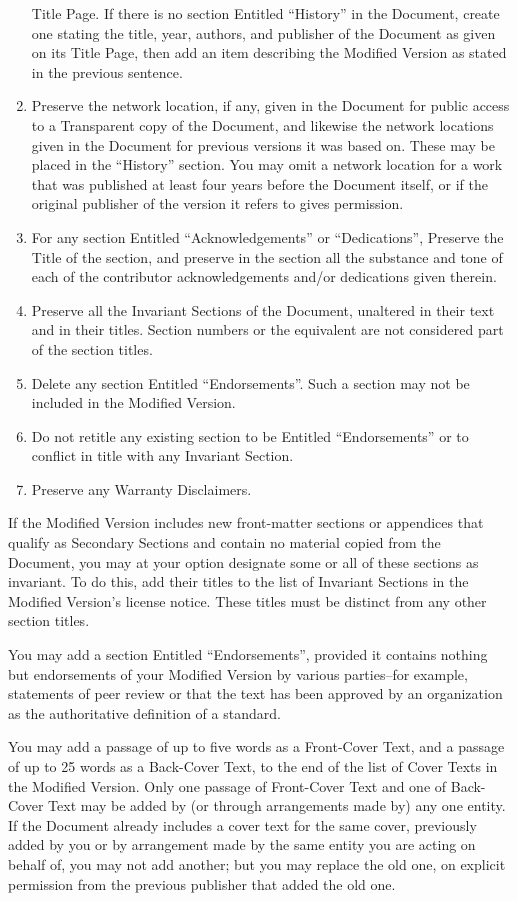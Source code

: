 \begin{enumerate}
       Title Page. If there is no section Entitled ``History'' in the Document, create one stating
       the title, year, authors, and publisher of the Document as given on its Title Page, then
       add an item describing the Modified Version as stated in the previous sentence.
 \item Preserve the network location, if any, given in the Document for public access to a
       Transparent copy of the Document, and likewise the network locations given in the Document
       for previous versions it was based on. These may be placed in the ``History'' section. You
       may omit a network location for a work that was published at least four years before the
       Document itself, or if the original publisher of the version it refers to gives permission.
 \item For any section Entitled ``Acknowledgements'' or ``Dedications'', Preserve the Title of the
       section, and preserve in the section all the substance and tone of each of the contributor
       acknowledgements and/or dedications given therein.
 \item Preserve all the Invariant Sections of the Document, unaltered in their text and in their
       titles. Section numbers or the equivalent are not considered part of the section titles.
 \item Delete any section Entitled ``Endorsements''. Such a section may not be included in the
       Modified Version.
 \item Do not retitle any existing section to be Entitled ``Endorsements'' or to conflict in title
       with any Invariant Section.
 \item Preserve any Warranty Disclaimers.
\end{enumerate}
\endgroup
If the Modified Version includes new front-matter sections or appendices that qualify as
Secondary Sections and contain no material copied from the Document, you may at your option
designate some or all of these sections as invariant. To do this, add their titles to the list of
Invariant Sections in the Modified Version’s license notice. These titles must be distinct from
any other section titles.

You may add a section Entitled ``Endorsements'', provided it contains nothing but endorsements
of your Modified Version by various parties–for example, statements of peer review or
that the text has been approved by an organization as the authoritative definition of a standard.

You may add a passage of up to five words as a Front-Cover Text, and a passage of up to
25 words as a Back-Cover Text, to the end of the list of Cover Texts in the Modified Version.
Only one passage of Front-Cover Text and one of Back-Cover Text may be added by (or through
arrangements made by) any one entity. If the Document already includes a cover text for the
same cover, previously added by you or by arrangement made by the same entity you are acting
on behalf of, you may not add another; but you may replace the old one, on explicit permission
from the previous publisher that added the old one.

